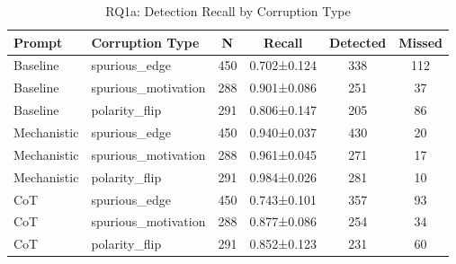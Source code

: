 \begin{table}[htbp]
\centering
\caption{RQ1a: Detection Recall by Corruption Type}
\label{tab:rq1a_corruption_type}
\begin{tabular}{llcccc}
\toprule
\textbf{Prompt} & \textbf{Corruption Type} & \textbf{N} & \textbf{Recall} & \textbf{Detected} & \textbf{Missed} \\
\midrule
Baseline & spurious_edge & 450 & 0.702±0.124 & 338 & 112 \\
Baseline & spurious_motivation & 288 & 0.901±0.086 & 251 & 37 \\
Baseline & polarity_flip & 291 & 0.806±0.147 & 205 & 86 \\
Mechanistic & spurious_edge & 450 & 0.940±0.037 & 430 & 20 \\
Mechanistic & spurious_motivation & 288 & 0.961±0.045 & 271 & 17 \\
Mechanistic & polarity_flip & 291 & 0.984±0.026 & 281 & 10 \\
CoT & spurious_edge & 450 & 0.743±0.101 & 357 & 93 \\
CoT & spurious_motivation & 288 & 0.877±0.086 & 254 & 34 \\
CoT & polarity_flip & 291 & 0.852±0.123 & 231 & 60 \\
\bottomrule
\end{tabular}
\end{table}